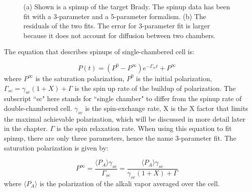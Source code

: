 \begin{figure}[H]
	\centering
	\caption{{(a) Shown is a spinup of the target Brady. The spinup data has been fit with a 3-parameter and a 5-parameter formalism. (b) The residuals of the two fits. The error for 3-parameter fit is larger because it does not account for diffusion between two chambers.}}
	\label{spinup}
\end{figure}

The equation that describes spinups of single-chambered cell is: 

\begin{equation}
P(t)=(P^{0}-P^{\infty})e^{-\Gamma_{sc}t}+P^{\infty}
\end{equation}
where $P^{\infty}$ is the saturation polarization, $P^{0}$ is the initial polarization, $\Gamma_{sc}=\gamma_{se}(1+X)+\Gamma$ is the spin up rate of the buildup of polarization. The subscript ``sc" here stands for ``single chamber" to differ from the spinup rate of double-chambered cell. $\gamma_{se}$ is the spin-exchange rate, X is the X factor that limits the maximal achievable polarization, which will be discussed in more detail later in the chapter. $\Gamma$ is the spin relaxation rate. When using this equation to fit spinup, there are only three parameters, hence the name 3-parameter fit. The saturation polarization is given by:

\begin{equation}
P^{\infty}=\frac{\langle P_{A}\rangle \gamma_{se}}{\Gamma_{sc}}=\frac{\langle P_{A}\rangle\gamma_{se}}{\gamma_{se}(1+X)+\Gamma}
\end{equation}
where $\langle P_{A}\rangle$ is the polarization of the alkali vapor averaged over the cell.

